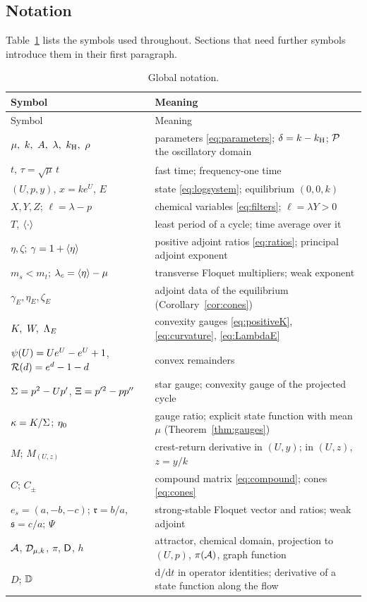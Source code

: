 \subsection{Notation}
Table~\ref{tab:notation} lists the symbols used throughout. Sections that need further symbols introduce them in their first paragraph.

{\small
\begin{longtable}{p{}p{}}
\caption{Global notation.}\label{tab:notation}\\
\toprule
Symbol & Meaning\\
\midrule
\endfirsthead
\toprule
Symbol & Meaning\\
\midrule
\endhead
\bottomrule
\endfoot
$\mu,\ k,\ A,\ \lambda,\ \kH,\ \rho$ & parameters \eqref{eq:parameters}; $\delta=k-k_{\mathrm H}$; $\mathcal P$ the oscillatory domain\\
$t$, $\tau=\sqrt\mu\,t$ & fast time; frequency-one time\\
$(U,p,y)$, $x=ke^U$, $E$ & state \eqref{eq:logsystem}; equilibrium $(0,0,k)$\\
$X,Y,Z$; $\ell=\lambda-p$ & chemical variables \eqref{eq:filters}; $\ell=\lambda Y>0$\\
$T$, $\left\langle \cdot\right\rangle$ & least period of a cycle; time average over it\\
$\eta,\zeta$; $\gamma=1+\left\langle \eta\right\rangle$ & positive adjoint ratios \eqref{eq:ratios}; principal adjoint exponent\\
$m_s<m_t$; $\lambda_c=\left\langle \eta\right\rangle-\mu$ & transverse Floquet multipliers; weak exponent\\
$\gamma_E,\eta_E,\zeta_E$ & adjoint data of the equilibrium (Corollary~\ref{cor:cones})\\
$K,\ W,\ \LamE$ & convexity gauges \eqref{eq:positiveK}, \eqref{eq:curvature}, \eqref{eq:LambdaE}\\
$\psi(U)=Ue^U-e^U+1$, $\mathcal R(d)=e^d-1-d$ & convex remainders\\
$\Sigma=p^2-Up'$, $\Xi=p'^2-pp''$ & star gauge; convexity gauge of the projected cycle\\
$\kappa=K/\Sigma$; $\eta_0$ & gauge ratio; explicit state function with mean $\mu$ (Theorem~\ref{thm:gauges})\\
$M$; $M_{(U,z)}$ & crest-return derivative in $(U,y)$; in $(U,z)$, $z=y/k$\\
$C$; $C_\pm$ & compound matrix \eqref{eq:compound}; cones \eqref{eq:cones}\\
$e_s=(a,-b,-c)$; $\mathfrak r=b/a$, $\mathfrak s=c/a$; $\Psi$ & strong-stable Floquet vector and ratios; weak adjoint\\
$\mathcal A$, $\mathcal D_{\mu,k}$, $\pi$, $\mathsf D$, $h$ & attractor, chemical domain, projection to $(U,p)$, $\pi(\mathcal A)$, graph function\\
$D$; $\mathbb D$ & $\mathrm d/\mathrm dt$ in operator identities; derivative of a state function along the flow\\
\end{longtable}}
